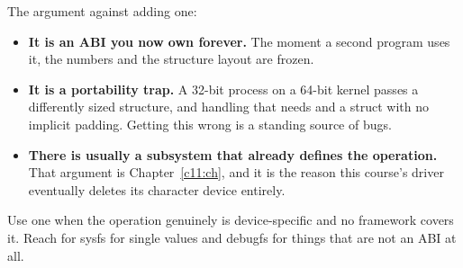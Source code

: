 The argument against adding one:
\begin{itemize}
  \item \textbf{It is an ABI you now own forever.} The moment a second program uses it, the numbers
    and the structure layout are frozen.
  \item \textbf{It is a portability trap.} A 32-bit process on a 64-bit kernel passes a differently
    sized structure, and handling that needs  and a struct with no implicit
    padding. Getting this wrong is a standing source of bugs.
  \item \textbf{There is usually a subsystem that already defines the operation.} That argument is
    Chapter~\ref{c11:ch}, and it is the reason this course's driver eventually deletes its character
    device entirely.
\end{itemize}
Use one when the operation genuinely is device-specific and no framework covers it. Reach for sysfs
for single values and debugfs for things that are not an ABI at all.
